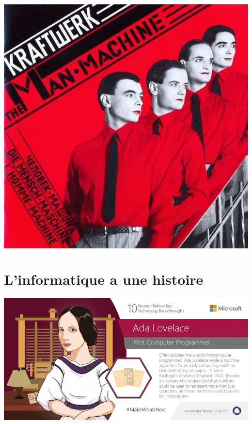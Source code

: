 \documentclass[french]{beamer}
\begin{document}
\begin{frame}
   \begin{center}
\includegraphics[height=.8\textheight]{./manmachine.jpeg}
\end{center}
\end{frame}

\section{L'informatique a une histoire}


\begin{frame}
  \begin{center}
\includegraphics[height=.7\textheight]{./ada.jpg}
    
  \end{center}


\end{frame}
\end{document}
